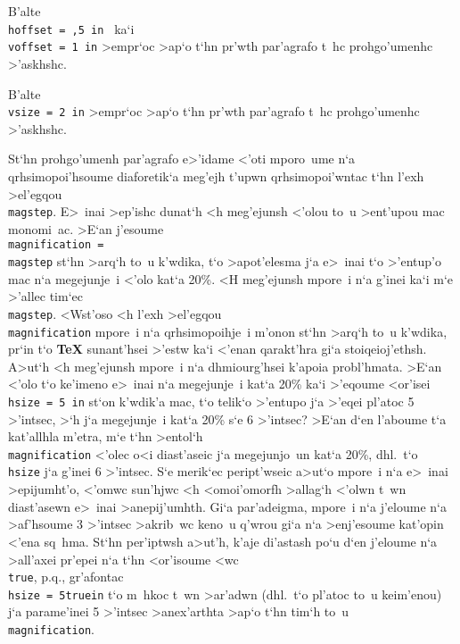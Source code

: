 \exercise B'alte {\tt \\hoffset = ,5 in\ } ka`i {\tt \\voffset = 1      
in} >empr`oc >ap`o t`hn pr'wth par'agrafo t~hc prohgo'umenhc >'askhshc.

\exercise  B'alte {\tt \\vsize = 2 in} >empr`oc >ap`o t`hn pr'wth
par'agrafo t~hc prohgo'umenhc >'askhshc.

St`hn prohgo'umenh par'agrafo e>'idame <'oti mporo~ume n`a 
qrhsimopoi'hsoume diaforetik`a meg'ejh t'upwn qrhsimopoi'wntac t`hn
l'exh >el'egqou {\tt \\magstep}.  E>~inai >ep'ishc dunat`h <h
meg'e\-jun\-sh <'olou to~u >ent'upou mac monomi~ac.  >E`an j'esoume {\tt
\\magnification = \\magstep{}} st`hn >arq`h to~u k'wdika, t`o
>apot'elesma j`a e>~inai t`o >'entup'o mac n`a  megejunje~i <'olo kat`a
20\NB \%\null. <H meg'ejunsh mpore~i n`a g'inei ka`i m`e >'allec tim`ec
{\tt \\magstep}. <Wst'oso {\tengb <h l'exh >el'egqou {\tt
\\magnification} mpore~i n`a qrhsimopoihje~i m'onon st`hn >arq`h to~u
k'wdika, pr`in t`o {\bf \TeX} sunant'hsei >'estw ka`i <'enan qarakt'hra
gi`a stoiqeioj'ethsh.}  A>ut`h <h meg'ejunsh mpore~i n`a dhmiourg'hsei
k'apoia probl'hmata. >E`an <'olo t`o ke'imeno e>~inai
n`a megejunje~i kat`a 20\NB \% ka`i >'eqoume <or'isei {\tt \\hsize = 5
in} st`on k'wdik'a mac, t`o telik`o >'entupo j`a >'eqei pl'atoc 5
>'intsec, >`h j`a megejunje~i kat`a 20\NB{}\% s`e 6 >'intsec?  >E`an
d`en l'aboume t`a kat'al\-lhla m'etra, m`e t`hn >entol`h {\tt
\\magnification} <'olec o<i diast'aseic j`a megejunjo~un kat`a
20\NB{}\%, dhl.\ t`o {\tt \\hsize} j`a g'inei 6 >'intsec.  S`e merik`ec
peript'wseic a>ut`o mpore~i n`a e>~inai >epijumht'o, <'omwc sun'hjwc <h
<omoi'omorfh >allag`h <'olwn t~wn diast'asewn e>~inai >anepij'umhth. 
Gi`a par'adeigma, mpore~i n`a j'eloume n`a >af'hsoume 3 >'intsec
>akrib~wc keno~u q'wrou gi`a n`a >enj'esoume kat'opin <'ena sq~hma. 
St`hn per'iptwsh a>ut'h, k'aje di'astash po`u d`en j'eloume n`a
>all'axei pr'epei n`a t`hn <or'isoume <wc {\tt \\true}, p.q., gr'afontac
{\tt \\hsize = 5\NB{}true\NB{}in} t`o m~hkoc t~wn >ar'adwn (dhl.\ t`o
pl'atoc to~u keim'enou) j`a parame'inei 5 >'intsec >anex'arthta >ap`o
t`hn tim`h to~u {\tt \\magnification}.

